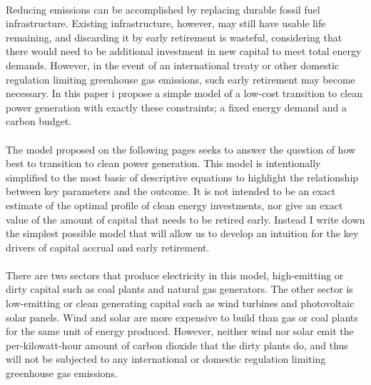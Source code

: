 \documentclass{article}
\begin{document}
\paragraph{} Reducing emissions can be accomplished by replacing durable fossil fuel infrastructure. Existing infrastructure, however, may still have usable life remaining, and discarding it by early retirement is wasteful, considering that there would need to be additional investment in new capital to meet total energy demands. However, in the event of an international treaty or other domestic regulation limiting greenhouse gas emissions, such early retirement may become necessary. In this paper i propose a simple model of a low-cost transition to clean power generation with exactly these constraints; a fixed energy demand and a carbon budget. 

\paragraph{} The model proposed on the following pages seeks to answer the question of how best to transition to clean power generation. This model is intentionally simplified to the most basic of descriptive equations to highlight the relationship between key parameters and the outcome. It is not intended to be an exact estimate of the optimal profile of clean energy investments, nor give an exact value of the amount of capital that needs to be retired early. Instead I write down the simplest possible model that will allow us to develop an intuition for the key drivers of capital accrual and early retirement. 

\paragraph{} There are two sectors that produce electricity in this model, high-emitting or dirty capital such as coal plants and natural gas generators. The other sector is low-emitting or clean generating capital such as wind turbines and photovoltaic solar panels. Wind and solar are more expensive to build than gas or coal plants for the same unit of energy produced. However, neither wind nor solar emit the  per-kilowatt-hour amount of carbon dioxide that the dirty plants do, and thus will not be subjected to any international or domestic regulation limiting greenhouse gas emissions. 
\end{document}
